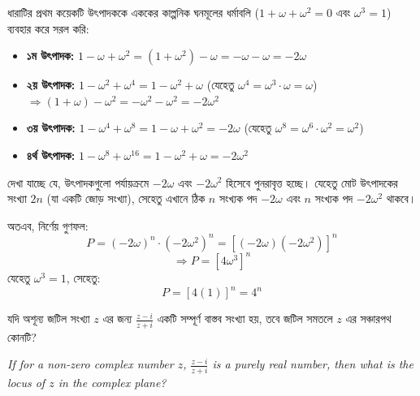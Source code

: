 \documentclass[12pt, a4paper]{article}
\begin{document}
\begin{tcolorbox}[solutionbox={সমাধান (Solution)}]
    \noindent
    ধারাটির প্রথম কয়েকটি উৎপাদককে এককের কাল্পনিক ঘনমূলের ধর্মাবলি ($1 + \omega + \omega^2 = 0$ এবং $\omega^3 = 1$) ব্যবহার করে সরল করি:
    \begin{itemize}[itemsep=0.4em]
        \item \textbf{১ম উৎপাদক:} $1 - \omega + \omega^2 = (1 + \omega^2) - \omega = -\omega - \omega = -2\omega$
        \item \textbf{২য় উৎপাদক:} $1 - \omega^2 + \omega^4 = 1 - \omega^2 + \omega$ (যেহেতু $\omega^4 = \omega^3 \cdot \omega = \omega$) \\
        $\Rightarrow (1 + \omega) - \omega^2 = -\omega^2 - \omega^2 = -2\omega^2$
        \item \textbf{৩য় উৎপাদক:} $1 - \omega^4 + \omega^8 = 1 - \omega + \omega^2 = -2\omega$ (যেহেতু $\omega^8 = \omega^6 \cdot \omega^2 = \omega^2$)
        \item \textbf{৪র্থ উৎপাদক:} $1 - \omega^8 + \omega^{16} = 1 - \omega^2 + \omega = -2\omega^2$
    \end{itemize}
    
    \vspace{0.5em}
    দেখা যাচ্ছে যে, উৎপাদকগুলো পর্যায়ক্রমে $-2\omega$ এবং $-2\omega^2$ হিসেবে পুনরাবৃত্ত হচ্ছে। যেহেতু মোট উৎপাদকের সংখ্যা $2n$ (যা একটি জোড় সংখ্যা), সেহেতু এখানে ঠিক $n$ সংখ্যক পদ $-2\omega$ এবং $n$ সংখ্যক পদ $-2\omega^2$ থাকবে। 
    
    \vspace{0.5em}
    অতএব, নির্ণেয় গুণফল:
    \[ P = (-2\omega)^n \cdot (-2\omega^2)^n = [(-2\omega)(-2\omega^2)]^n \]
    \[ \Rightarrow P = [4\omega^3]^n \]
    যেহেতু $\omega^3 = 1$, সেহেতু:
    \[ P = [4(1)]^n = 4^n \]
\end{tcolorbox}
\begin{tcolorbox}[questionbox={প্রশ্ন (Question) 19}]
    \noindent
    যদি অশূন্য জটিল সংখ্যা $z$ এর জন্য $\frac{z - i}{z + i}$ একটি সম্পূর্ণ বাস্তব সংখ্যা হয়, তবে জটিল সমতলে $z$ এর সঞ্চারপথ কোনটি?
    
    \vspace{0.8em}
    \begin{english}
    \noindent\textit{\color{darkgray}
    If for a non-zero complex number $z$, $\frac{z - i}{z + i}$ is a purely real number, then what is the locus of $z$ in the complex plane?
    }
    \end{english}
\end{tcolorbox}
\end{document}
